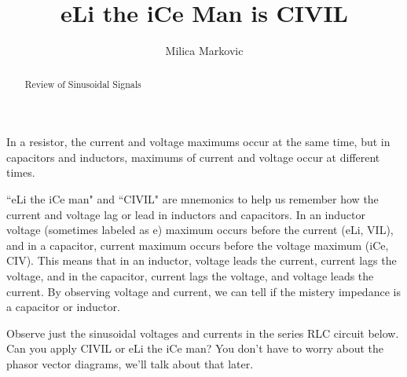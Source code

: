 \documentclass{ximera}
\title{eLi the iCe Man is CIVIL}
\author{Milica Markovic}
\begin{document}
  
\begin{abstract}  
Review of Sinusoidal Signals
\end{abstract}  
\maketitle

In a resistor, the current and voltage maximums occur at the same time, but in capacitors and inductors, maximums of current and voltage occur at different times.

``eLi the iCe man" and ``CIVIL" are mnemonics to help us remember how the current and voltage lag or lead in inductors and capacitors. In an inductor voltage (sometimes labeled as e) maximum occurs before the current (eLi, VIL), and in a capacitor, current maximum occurs before the voltage maximum (iCe, CIV). This means that in an inductor, voltage leads the current,  current lags the voltage, and in the capacitor, current lags the voltage, and voltage leads the current. By observing voltage and current, we can tell if the mistery impedance is a capacitor or inductor. 

\begin{example}
Observe just the sinusoidal voltages and currents in the series RLC circuit below. Can you apply CIVIL or eLi the iCe man? You don't have to worry about the phasor vector diagrams, we'll talk about that later.

\begin{center}  
\end{center} 
\end{example}
\end{document}

